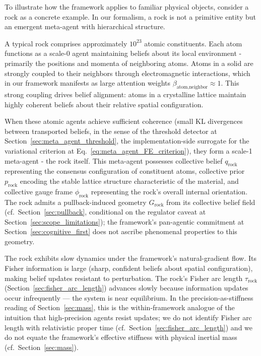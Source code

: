 \documentclass[11pt]{article}
\begin{document}
To illustrate how the framework applies to familiar physical objects, consider a rock as a concrete example. In our formalism, a rock is not a primitive entity but an emergent meta-agent with hierarchical structure.

A typical rock comprises approximately $10^{23}$ atomic constituents. Each atom functions as a scale-0 agent maintaining beliefs about its local environment - primarily the positions and momenta of neighboring atoms. Atoms in a solid are strongly coupled to their neighbors through electromagnetic interactions, which in our framework manifests as large attention weights $\beta_{\text{atom,neighbor}} \approx 1$. This strong coupling drives belief alignment: atoms in a crystalline lattice maintain highly coherent beliefs about their relative spatial configuration.

When these atomic agents achieve sufficient coherence (small KL divergences between transported beliefs, in the sense of the threshold detector at Section~\ref{sec:meta_agent_threshold}, the implementation-side surrogate for the variational criterion at Eq.~\eqref{eq:meta_agent_FE_criterion}), they form a scale-1 meta-agent - the rock itself. This meta-agent possesses collective belief $q_{\text{rock}}$ representing the consensus configuration of constituent atoms, collective prior $p_{\text{rock}}$ encoding the stable lattice structure characteristic of the material, and collective gauge frame $\phi_{\text{rock}}$ representing the rock's overall internal orientation. The rock admits a pullback-induced geometry $G_{\text{rock}}$ from its collective belief field (cf.\ Section~\ref{sec:pullback}, conditional on the regulator caveat at Section~\ref{sec:scope_limitations}); the framework's pan-agentic commitment at Section~\ref{sec:cognitive_first} does not ascribe phenomenal properties to this geometry.

The rock exhibits slow dynamics under the framework's natural-gradient flow. Its Fisher information is large (sharp, confident beliefs about spatial configuration), making belief updates resistant to perturbation. The rock's Fisher arc length $\tau_{\text{rock}}$ (Section~\ref{sec:fisher_arc_length}) advances slowly because information updates occur infrequently — the system is near equilibrium. In the precision-as-stiffness reading of Section~\ref{sec:mass}, this is the within-framework analogue of the intuition that high-precision agents resist updates; we do not identify Fisher arc length with relativistic proper time (cf.\ Section~\ref{sec:fisher_arc_length}) and we do not equate the framework's effective stiffness with physical inertial mass (cf.\ Section~\ref{sec:mass}).
\end{document}
